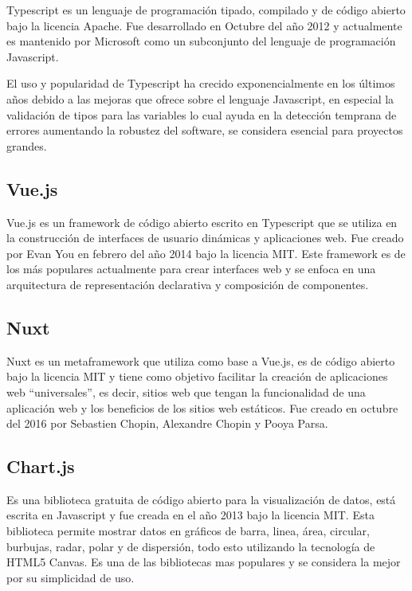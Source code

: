Typescript es un lenguaje de programación tipado, compilado y de código abierto bajo la licencia Apache. Fue desarrollado en Octubre del año 2012 y actualmente es mantenido por Microsoft como un subconjunto del lenguaje de programación Javascript.  

El uso y popularidad de Typescript ha crecido exponencialmente en los últimos años debido a las mejoras que ofrece sobre el lenguaje Javascript, en especial la validación de tipos para las variables lo cual ayuda en la detección temprana de errores aumentando la robustez del software, se considera esencial para proyectos grandes.

\subsection{Vue.js}

Vue.js es un framework de código abierto escrito en Typescript que se utiliza en la construcción de interfaces de usuario dinámicas y aplicaciones web. Fue creado por Evan You en febrero del año 2014 bajo la licencia MIT. Este framework es de los más populares actualmente para crear interfaces web y se enfoca en una arquitectura de representación declarativa y composición de componentes. 

\subsection{Nuxt}

Nuxt es un metaframework que utiliza como base a Vue.js, es de código abierto bajo la licencia MIT y tiene como objetivo facilitar la creación de aplicaciones web “universales”, es decir, sitios web que tengan la funcionalidad de una aplicación web y los beneficios de los sitios web estáticos. Fue creado en octubre del 2016 por Sebastien Chopin, Alexandre Chopin y Pooya Parsa.

\subsection{Chart.js}

Es una biblioteca gratuita de código abierto para la visualización de datos, está escrita en Javascript y fue creada en el año 2013 bajo la licencia MIT. Esta biblioteca permite mostrar datos en gráficos de barra, linea, área, circular, burbujas, radar, polar y de dispersión, todo esto utilizando la tecnología de HTML5 Canvas. Es una de las bibliotecas mas populares y se considera la mejor por su simplicidad de uso.

